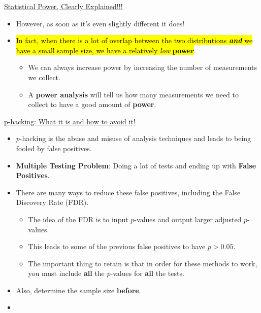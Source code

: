 \documentclass[12pt, titlepage, french]{report}
\begin{document}
\begin{YTB_SUMM_AUTO_NUMB}[label = {SQ-P-statpower}]{\href{https://www.youtube.com/watch?v=Rsc5znwR5FA&feature=youtu.be}{Statistical Power, Clearly Explained!!!}}
\begin{itemize}[leftmargin = *]
\begin{center}
		\end{center}		 
	\item	However, as soon as it's even slightly different it does!
	\item	\hl{In fact, when there is a lot of overlap between the two distributions \textit{\textbf{and}} we have a small sample size, we have a relatively \textit{low} \textbf{power}}.
		\begin{itemize}
		\item	We can always increase power by increasing the number of measurements we collect.
		\item	A \textbf{power analysis} will tell us how many measurements we need to collect to have a good amount of \textbf{power}.
		\end{itemize}
\end{itemize}
\end{YTB_SUMM_AUTO_NUMB}


\begin{YTB_SUMM_AUTO_NUMB}[label = {SQ-phacking}]{\href{https://www.youtube.com/watch?v=HDCOUXE3HMM}{p-hacking: What it is and how to avoid it!}}
\begin{itemize}[leftmargin = *]
	\item	$p$-hacking is the abuse and misuse of analysis techniques and leads to being fooled by false positives.
	\item	\textbf{Multiple Testing Problem}: Doing a lot of tests and ending up with \textbf{False Positives}.
	\item	There are many ways to reduce these false positives, including the False Discovery Rate (FDR).
		\begin{itemize}
		\item	The idea of the FDR is to input $p$-values and output larger adjusted $p$-values.
		\item	This leads to some of the previous false positives to have $p > 0.05$.
		\item	The important thing to retain is that in order for these methods to work, you must include \textbf{all} the $p$-values for \textbf{all} the tests.
		\end{itemize}
	\item	Also, determine the sample size \textbf{before}.
\end{itemize}
\end{YTB_SUMM_AUTO_NUMB}


\begin{YTB_SUMM_AUTO_NUMB}[label = {SQ-}]{\href{}{}}
\begin{itemize}[leftmargin = *]
	\item	
\end{itemize}
\end{YTB_SUMM_AUTO_NUMB}
\end{document}
